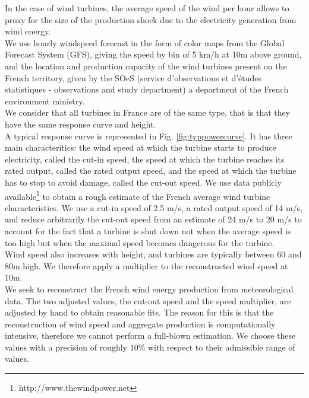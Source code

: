 In the case of wind turbines, the average speed of the wind per hour allows to proxy for the size of the production shock due to the electricity generation from wind energy. \\

We use hourly windspeed forecast in the form of color maps from the Global Forecast System (GFS), giving the speed by bin of 5 km/h at 10m above ground, and the location and production capacity of the wind turbines present on the French territory, given by the SOeS (service d'observations et d'études statistiques - observations and study department) a department of the French environment ministry. \\

We consider that all turbines in France are of the same type, that is that they have the same response curve and height. \\

A typical response curve is represented in Fig. \ref{fig:typpowercurve}. It has three main characteritics: the wind speed at which the turbine starts to produce electricity, called the cut-in speed, the speed at which the turbine reaches its rated output, called the rated output speed, and the speed at which the turbine has to stop to avoid damage, called the cut-out speed. We use data publicly available\footnote{http://www.thewindpower.net } to obtain a rough estimate of the French average wind turbine characteristics. We use a cut-in speed of 2.5 m/s, a rated output speed of 14 m/s, and reduce arbitrarily the cut-out speed from an estimate of 24 m/s to 20 m/s to account for the fact that a turbine is shut down not when the average speed is too high but when the maximal speed becomes dangerous for the turbine.\\ 

Wind speed also increases with height, and turbines are typically between 60 and 80m high. We therefore apply a multiplier to the reconstructed wind speed at 10m. \\

We seek to reconstruct the French wind energy production from meteorological data. The two adjusted values, the cut-out speed and the speed multiplier, are adjusted by hand to obtain reasonable fits. The reason for this is that the reconstruction of wind speed and aggregate production is computationally intensive, therefore we cannot perform a full-blown estimation. We choose these values with a precision of roughly 10\% with respect to their admissible range of values. \\

